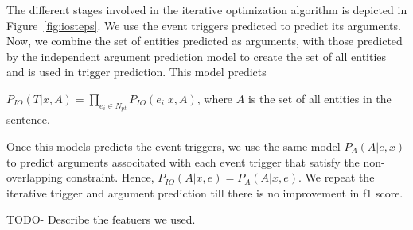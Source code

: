 The different stages involved in the iterative optimization algorithm is depicted in Figure~\ref{fig:iosteps}. We use the event triggers predicted to predict its arguments. Now, we combine the set of entities predicted as arguments, with those predicted by the independent argument prediction model to create the set of all entities and is used in trigger prediction. This model predicts

$P_{IO}(T | x, A) = \prod_{e_{i}\in N_{pt}} P_{IO}(e_{i} | x, A) $, where $A$ is the set of all entities in the sentence.

Once this models predicts the event triggers, we use the same model $P_{A}(A | e,x)$ to predict arguments associtated with each event trigger that satisfy the non-overlapping constraint. Hence, $P_{IO}(A | x, e) = P_{A}(A | x, e)$. We repeat the iterative trigger and argument prediction till there is no improvement in f1 score.

TODO- Describe the featuers we used.
